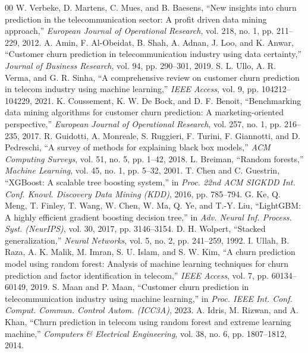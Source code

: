 \documentclass[conference]{IEEEtran}
\begin{document}
\begin{thebibliography}{00}
 W. Verbeke, D. Martens, C. Mues, and B. Baesens, ``New insights into churn prediction in the telecommunication sector: A profit driven data mining approach,'' \emph{European Journal of Operational Research}, vol. 218, no. 1, pp. 211--229, 2012.
 A. Amin, F. Al-Obeidat, B. Shah, A. Adnan, J. Loo, and K. Anwar, ``Customer churn prediction in telecommunication industry using data certainty,'' \emph{Journal of Business Research}, vol. 94, pp. 290--301, 2019.
 S. L. Ullo, A. R. Verma, and G. R. Sinha, ``A comprehensive review on customer churn prediction in telecom industry using machine learning,'' \emph{IEEE Access}, vol. 9, pp. 104212--104229, 2021.
 K. Coussement, K. W. De Bock, and D. F. Benoit, ``Benchmarking data mining algorithms for customer churn prediction: A marketing-oriented perspective,'' \emph{European Journal of Operational Research}, vol. 257, no. 1, pp. 216--235, 2017.
 R. Guidotti, A. Monreale, S. Ruggieri, F. Turini, F. Giannotti, and D. Pedreschi, ``A survey of methods for explaining black box models,'' \emph{ACM Computing Surveys}, vol. 51, no. 5, pp. 1--42, 2018.
 L. Breiman, ``Random forests,'' \emph{Machine Learning}, vol. 45, no. 1, pp. 5--32, 2001.
 T. Chen and C. Guestrin, ``XGBoost: A scalable tree boosting system,'' in \emph{Proc. 22nd ACM SIGKDD Int. Conf. Knowl. Discovery Data Mining (KDD)}, 2016, pp. 785--794.
 G. Ke, Q. Meng, T. Finley, T. Wang, W. Chen, W. Ma, Q. Ye, and T.-Y. Liu, ``LightGBM: A highly efficient gradient boosting decision tree,'' in \emph{Adv. Neural Inf. Process. Syst. (NeurIPS)}, vol. 30, 2017, pp. 3146--3154.
 D. H. Wolpert, ``Stacked generalization,'' \emph{Neural Networks}, vol. 5, no. 2, pp. 241--259, 1992.
 I. Ullah, B. Raza, A. K. Malik, M. Imran, S. U. Islam, and S. W. Kim, ``A churn prediction model using random forest: Analysis of machine learning techniques for churn prediction and factor identification in telecom,'' \emph{IEEE Access}, vol. 7, pp. 60134--60149, 2019.
 S. Maan and P. Maan, ``Customer churn prediction in telecommunication industry using machine learning,'' in \emph{Proc. IEEE Int. Conf. Comput. Commun. Control Autom. (ICC3A)}, 2023.
 A. Idris, M. Rizwan, and A. Khan, ``Churn prediction in telecom using random forest and extreme learning machine,'' \emph{Computers \& Electrical Engineering}, vol. 38, no. 6, pp. 1807--1812, 2014.

\end{thebibliography}
\end{document}
